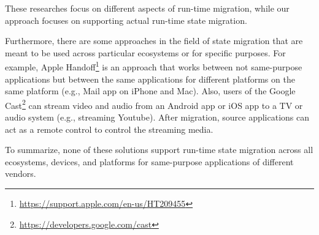 These researches focus on different aspects of run-time migration, while our approach focuses on supporting actual run-time state migration.

Furthermore, there are some approaches in the field of state migration that are meant to be used across particular ecosystems or for specific purposes. For example, Apple Handoff\footnote{\url{https://support.apple.com/en-us/HT209455}} is an approach that works between not same-purpose applications but between the same applications for different platforms on the same platform (e.g., Mail app on iPhone and Mac). Also, users of the Google Cast\footnote{\url{https://developers.google.com/cast}} can stream video and audio from an Android app or iOS app to a TV or audio system (e.g., streaming Youtube). After migration, source applications can act as a remote control to control the streaming media.

To summarize, none of these solutions support run-time state migration across all ecosystems, devices, and platforms for same-purpose applications of different vendors.
